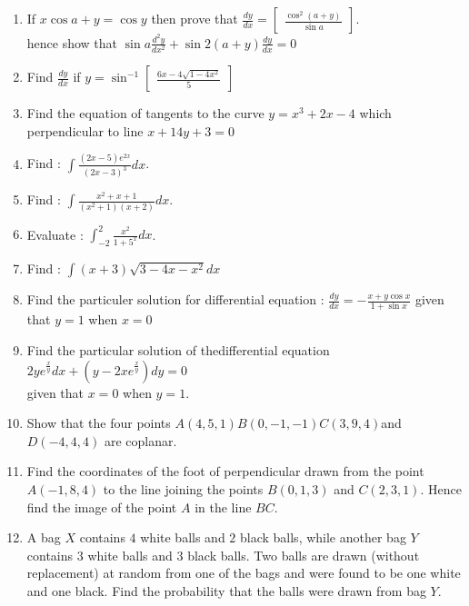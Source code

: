 \documentclass[12pt,-letter paper]{article}
\providecommand{\myvec}[1]{\ensuremath{\begin{bmatrix}#1\end{bmatrix}}}
\providecommand{\brak}[1]{\ensuremath{\left(#1\right)}}
\begin{document}
\begin{enumerate}
\item If $x\cos{a+y}=\cos{y}$ then prove that $\frac{dy}{dx}=\myvec{\frac{\cos^2\brak{a+y}}{\sin a}}$.\\
	hence show that $\sin a\frac{d^{2}y}{dx^2}+\sin 2\brak{a+y}\frac{dy}{dx}=0$

      

\item	Find $\frac{dy}{dx}$ if $y=\sin^{-1}\myvec{\frac{6x-4\sqrt{1-4x^2}}{5}}$
	\item Find the equation of tangents to the curve $y = x ^ 3 + 2x - 4$ which perpendicular to line $x + 14y + 3 = 0$
	
	\item Find : $\int\frac{\brak{2x-5}e^{2x}}{\brak{2x-3}^3}dx$.

		

	\item	Find : $\int\frac{x^2+x+1}{\brak{x^{2}+1}\brak{x+2}}dx$.

	\item Evaluate : $\int_{-2}^{2}\frac{x^2}{1+5^x}dx$.

	\item Find : $\int{\brak{x+3}\sqrt{3-4x-x^2}}dx$
	
	\item Find the particuler solution for differential equation : $\frac{dy}{dx}=-\frac{x+y\cos x}{1+\sin x}$ given that $y=1$ when $x=0$
	
	\item Find the particular solution of thedifferential equation $2ye^\frac{x}{y}dx+\brak{y-2xe^\frac{x}{y}}dy=0$\\given that $x=0$ when $y=1$.
	
	\item Show that the four points $A\brak{4, 5, 1} B\brak{0, -1, -1} C\brak{3, 9, 4}$and $D\brak{-4, 4, 4}$ are coplanar.
    
	\item Find the coordinates of the foot of perpendicular drawn from the point $A\brak{-1, 8, 4}$ to the line joining the points $B\brak{0, 1, 3}$ and $C\brak{2,3,1}$. Hence find the image of the point $A$ in the line $BC$.
    
	\item A bag $X$ contains $4$ white balls and $2$ black balls, while another bag $Y$ contains $3$ white balls and $3$ black balls. Two balls are drawn (without replacement) at random from one of the bags and were found to be one white and one black. Find the probability that the balls were drawn from bag $Y$.
	

\end{enumerate}
\end{document}
